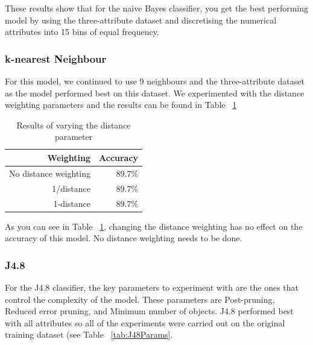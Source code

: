 \documentclass[a4paper,11pt]{article}
\begin{document}
These results show that for the naive Bayes classifier, you get the best performing model by using the three-attribute
dataset and discretising the numerical attributes into 15 bins of equal frequency.

\subsubsection{k-nearest Neighbour}

For this model, we continued to use 9 neighbours and the three-attribute dataset as the model performed best on this dataset.
 We experimented with the distance weighting parameters and the results can be found in Table ~\ref{tab:kNNParams}

\begin{table}[H]
  \begin{center}
    \begin{tabular}{r | r}
      Weighting & Accuracy  \\ \hline
      No distance weighting & 89.7\% \\
      1/distance & 89.7\% \\
      1-distance & 89.7\% \\
    \end{tabular}
  \end{center}
  \caption{Results of varying the distance parameter}
  \label{tab:kNNParams}
\end{table}

As you can see in Table ~\ref{tab:kNNParams}, changing the distance weighting has no effect on the accuracy of this model.
No distance weighting needs to be done.

\subsubsection{J4.8}

For the J4.8 classifier, the key parameters to experiment with are the ones that control the complexity of the model.
These parameters are Post-pruning, Reduced error pruning, and Minimum number of objects. J4.8 performed best with
all attributes so all of the experiments were carried out on the original training dataset (see Table ~\ref{tab:J48Params}.
\end{document}
